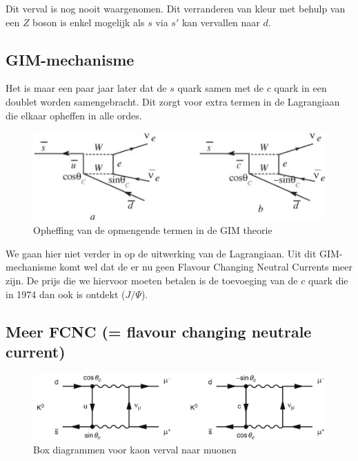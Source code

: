 \documentclass[../main.tex]{subfiles}
\begin{document}
Dit verval is nog nooit waargenomen. Dit verranderen van kleur met behulp van een $Z$ boson is enkel mogelijk als $s$ via $s'$ kan vervallen naar $d$.

\subsection{GIM-mechanisme}%
\label{sub:gim_mechanisme}

Het is maar een paar jaar later dat de $s$ quark samen met de $c$ quark in een doublet worden samengebracht. Dit zorgt voor extra termen in de Lagrangiaan die elkaar opheffen in alle ordes.

\begin{figure}[h]
    \centering
    \includegraphics[width=0.6\linewidth]{meson_mixing_and_oscillations/gim_opheffing.png}
    \caption{Opheffing van de opmengende termen in de GIM theorie}%
    \label{fig:meson_mixing_and_oscillations/gim_opheffing}
\end{figure}

We gaan hier niet verder in op de uitwerking van de Lagrangiaan. Uit dit GIM-mechanisme komt wel dat de er nu geen Flavour Changing Neutral Currents meer zijn. De prijs die we hiervoor moeten betalen is de toevoeging van de $c$ quark die in 1974 dan ook is ontdekt ($J/\Psi$).

\subsection{Meer FCNC (= flavour changing neutrale current)}%
\label{sub:meer_fcnc}

\begin{figure}[h]
    \centering
    \includegraphics[width=0.8\linewidth]{meson_mixing_and_oscillations/fcnc.png}
    \caption{Box diagrammen voor kaon verval naar muonen}%
    \label{fig:meson_mixing_and_oscillations/fcnc}
\end{figure}
\end{document}
